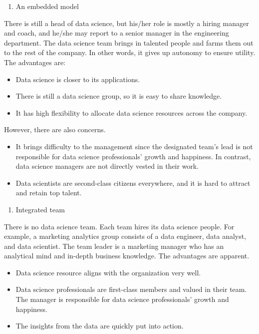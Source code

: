 \documentclass[12pt,]{krantz}
\providecommand{\tightlist}{%
  \setlength{\itemsep}{0pt}\setlength{\parskip}{0pt}}
\begin{document}
\begin{enumerate}
\def\labelenumi{(\arabic{enumi})}
\setcounter{enumi}{1}
\tightlist
\item
  An embedded model
\end{enumerate}

There is still a head of data science, but his/her role is mostly a hiring manager and coach, and he/she may report to a senior manager in the engineering department. The data science team brings in talented people and farms them out to the rest of the company. In other words, it gives up autonomy to ensure utility. The advantages are:

\begin{itemize}
\tightlist
\item
  Data science is closer to its applications.
\item
  There is still a data science group, so it is easy to share knowledge.
\item
  It has high flexibility to allocate data science resources across the company.
\end{itemize}

However, there are also concerns.

\begin{itemize}
\tightlist
\item
  It brings difficulty to the management since the designated team's lead is not responsible for data science professionals' growth and happiness. In contrast, data science managers are not directly vested in their work.
\item
  Data scientists are second-class citizens everywhere, and it is hard to attract and retain top talent.
\end{itemize}

\begin{enumerate}
\def\labelenumi{(\arabic{enumi})}
\setcounter{enumi}{2}
\tightlist
\item
  Integrated team
\end{enumerate}

There is no data science team. Each team hires its data science people. For example, a marketing analytics group consists of a data engineer, data analyst, and data scientist. The team leader is a marketing manager who has an analytical mind and in-depth business knowledge. The advantages are apparent.

\begin{itemize}
\tightlist
\item
  Data science resource aligns with the organization very well.
\item
  Data science professionals are first-class members and valued in their team. The manager is responsible for data science professionals' growth and happiness.
\item
  The insights from the data are quickly put into action.
\end{itemize}
\end{document}
